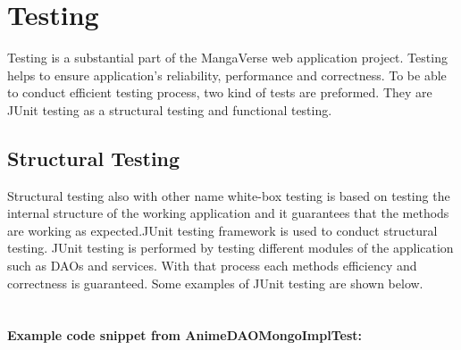 \chapter{Testing}
Testing is a substantial part of the MangaVerse web application project. Testing helps to ensure application's
reliability, performance and correctness. To be able to conduct efficient testing process, two kind of tests are preformed.
They are JUnit testing as a structural testing and functional testing.

\section{Structural Testing}
Structural testing also with other name white-box testing is based on testing the internal structure of the working application and it
guarantees that the methods are working as expected.JUnit testing framework is used to conduct structural testing. JUnit testing is performed by testing
different modules of the application such as DAOs and services. With that process each methods efficiency and correctness is guaranteed.
Some examples of JUnit testing are shown below.\\ \\


\subsubsection*{Example code snippet from AnimeDAOMongoImplTest:}


